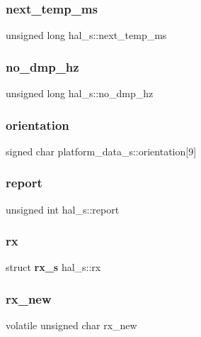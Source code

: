 \mbox{\label{group__e_m_p_l_gac1761962f130f7dd8065b5cc73fb58b0}} 
\subsubsection{next\+\_\+temp\+\_\+ms}
{\footnotesize\ttfamily unsigned long hal\+\_\+s\+::next\+\_\+temp\+\_\+ms}

\mbox{\label{group__e_m_p_l_gaac7ee68b2364db0bb34d2185d37a510f}} 
\subsubsection{no\+\_\+dmp\+\_\+hz}
{\footnotesize\ttfamily unsigned long hal\+\_\+s\+::no\+\_\+dmp\+\_\+hz}

\mbox{\label{group__e_m_p_l_gaf026bc5493793c52186a72b50bebba87}} 
\subsubsection{orientation}
{\footnotesize\ttfamily signed char platform\+\_\+data\+\_\+s\+::orientation[9]}

\mbox{\label{group__e_m_p_l_gafb36436c48c41d572db54d167140ae03}} 
\subsubsection{report}
{\footnotesize\ttfamily unsigned int hal\+\_\+s\+::report}

\mbox{\label{group__e_m_p_l_gafe5d5719cbbae00426834d2742330553}} 
\subsubsection{rx}
{\footnotesize\ttfamily struct \textbf{ rx\+\_\+s} hal\+\_\+s\+::rx}

\mbox{\label{group__e_m_p_l_ga5bfb2c29b84492416fe0a885d4664132}} 
\subsubsection{rx\+\_\+new}
{\footnotesize\ttfamily volatile unsigned char rx\+\_\+new}



